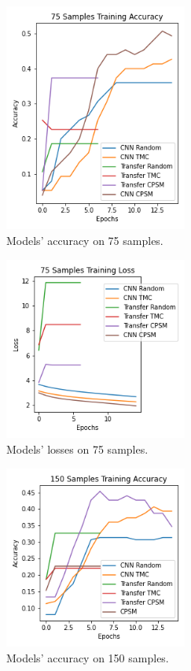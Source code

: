\documentclass[10pt,twocolumn,letterpaper]{article}
\begin{document}
\begin{figure}[!htb]
    \centering

    \includegraphics[width=6cm]{latex/figs/75_Accuracies(1).png}
    \caption{Models' accuracy on 75 samples.}
    \label{fig:data_selection_75}
\end{figure}

\begin{figure}[!htb]
    \centering

    \includegraphics[width=6cm]{latex/figs/75_Losses(1).png}
    \caption{Models' losses on 75 samples.}
    \label{fig:data_selection_75}
\end{figure}

\begin{figure}[!htb]
    \centering

    \includegraphics[width=6cm]{latex/figs/150_Accuracies(1).png}
    \caption{Models' accuracy on 150 samples.}
    \label{fig:data_selection_150}
\end{figure}
\end{document}
